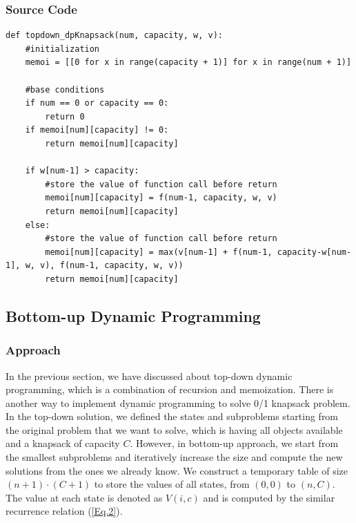 \documentclass{article}
\begin{document}
\subsubsection{Source Code}
\begin{lstlisting}[breaklines=true]
def topdown_dpKnapsack(num, capacity, w, v): 
    #initialization
    memoi = [[0 for x in range(capacity + 1)] for x in range(num + 1)]
    
    #base conditions
    if num == 0 or capacity == 0:   
        return 0
    if memoi[num][capacity] != 0:
        return memoi[num][capacity]
    
    if w[num-1] > capacity:
        #store the value of function call before return 
        memoi[num][capacity] = f(num-1, capacity, w, v)
        return memoi[num][capacity]
    else:
        #store the value of function call before return
        memoi[num][capacity] = max(v[num-1] + f(num-1, capacity-w[num-1], w, v), f(num-1, capacity, w, v))
        return memoi[num][capacity]
\end{lstlisting}

\subsection{Bottom-up Dynamic Programming}
\subsubsection{Approach}
In the previous section, we have discussed about top-down dynamic programming, which is a combination of recursion and memoization. There is another way to implement dynamic programming to solve 0/1 knapsack problem. \\
\indent In the top-down solution, we defined the states and subproblems starting from the original problem that we want to solve, which is having all objects available and a knapsack of capacity $C$. However, in bottom-up approach, we start from the smallest subproblems and iteratively increase the size and compute the new solutions from the ones we already know. We construct a temporary table of size $(n+1)\cdot(C+1)$ to store the values of all states, from $(0,0)$ to $(n,C)$. The value at each state is denoted as $V(i,c)$ and is computed by the similar recurrence relation (\ref{Eq.2}).
\end{document}

